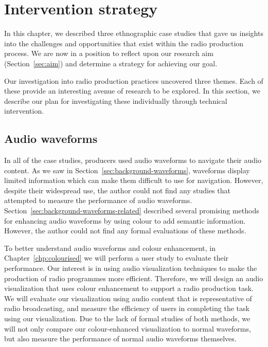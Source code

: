 \clearpage
\section{Intervention strategy}\label{sec:ethno-strategy}

In this chapter, we described three ethnographic case studies that gave us insights into the challenges and
opportunities that exist within the radio production process.  We are now in a position to reflect upon our research
aim (Section~\ref{sec:aim}) and determine a strategy for achieving our goal.

Our investigation into radio production practices uncovered three themes. Each of these provide an interesting avenue
of research to be explored. In this section, we describe our plan for investigating these individually through
technical intervention.

\subsection{Audio waveforms}

In all of the case studies, producers used audio waveforms to navigate their audio content.  As we saw in
Section~\ref{sec:background-waveforms}, waveforms display limited information which can make them difficult to use for
navigation.  However, despite their widespread use, the author could not find any studies that attempted to measure the
performance of audio waveforms.  Section~\ref{sec:background-waveforms-related} described several promising methods for
enhancing audio waveforms by using colour to add semantic information. However, the author could not find any formal
evaluations of these methods.

To better understand audio waveforms and colour enhancement, in Chapter~\ref{chp:colourised} we will perform a user
study to evaluate their performance. Our interest is in using audio visualization techniques to make the production of
radio programmes more efficient.  Therefore, we will design an audio visualization that uses colour enhancement to
support a radio production task.  We will evaluate our visualization using audio content that is representative of
radio broadcasting, and measure the efficiency of users in completing the task using our visualization. Due to the lack
of formal studies of both methods, we will not only compare our colour-enhanced visualization to normal waveforms, but
also measure the performance of normal audio waveforms themselves.

